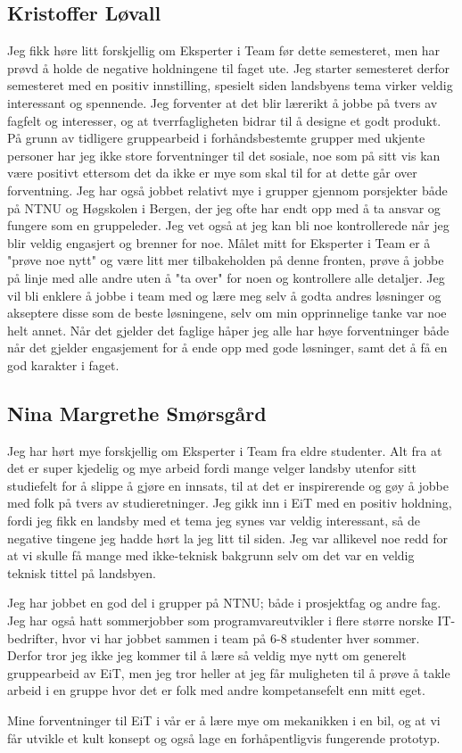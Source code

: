 \subsection*{Kristoffer Løvall}
Jeg fikk høre litt forskjellig om Eksperter i Team før dette semesteret, men har 
prøvd å holde de negative holdningene til faget ute. Jeg starter semesteret 
derfor semesteret med en positiv innstilling, spesielt siden landsbyens tema 
virker veldig interessant og spennende. Jeg forventer at det blir lærerikt å 
jobbe på tvers av fagfelt og interesser, og at tverrfagligheten bidrar til å 
designe et godt produkt. På grunn av tidligere gruppearbeid i forhåndsbestemte 
grupper med ukjente personer har jeg ikke store forventninger til det sosiale, 
noe som på sitt vis kan være positivt ettersom det da ikke er mye som skal til 
for at dette går over forventning. Jeg har også jobbet relativt mye i grupper 
gjennom porsjekter både på NTNU og Høgskolen i Bergen, der jeg ofte har endt opp 
med å ta ansvar og fungere som en gruppeleder. Jeg vet også at jeg kan bli noe 
kontrollerede når jeg blir veldig engasjert og brenner for noe.  Målet mitt for 
Eksperter i Team er å "prøve noe nytt" og være litt mer tilbakeholden på denne 
fronten, prøve å jobbe på linje med alle andre uten å "ta over" for noen og 
kontrollere alle detaljer. Jeg vil bli enklere å jobbe i team med og lære meg 
selv å godta andres løsninger og akseptere disse som de beste løsningene, selv om 
min opprinnelige tanke var noe helt annet. Når det gjelder det faglige håper jeg 
alle har høye forventninger både når det gjelder engasjement for å ende opp med 
gode løsninger, samt det å få en god karakter i faget.

\subsection*{Nina Margrethe Smørsgård}
Jeg har hørt mye forskjellig om Eksperter i Team fra eldre studenter. Alt fra 
at det er super kjedelig og mye arbeid fordi mange velger landsby utenfor sitt 
studiefelt for å slippe å gjøre en innsats, til at det er inspirerende og gøy 
å jobbe med folk på tvers av studieretninger. Jeg gikk inn i EiT med en positiv 
holdning, fordi jeg fikk en landsby med et tema jeg synes var veldig 
interessant, så de negative tingene jeg hadde hørt la jeg litt til siden. Jeg 
var allikevel noe redd for at vi skulle få mange med ikke-teknisk bakgrunn selv 
om det var en veldig teknisk tittel på landsbyen.

Jeg har jobbet en god del i grupper på NTNU; både i prosjektfag og andre fag.
Jeg har også hatt sommerjobber som programvareutvikler i flere større norske IT-
bedrifter, hvor vi har jobbet sammen i team på 6-8 studenter hver sommer. 
Derfor tror jeg ikke jeg kommer til å lære så veldig mye nytt om generelt 
gruppearbeid av EiT, men jeg tror heller at jeg får muligheten til å prøve å 
takle arbeid i en gruppe hvor det er folk med andre kompetansefelt enn mitt eget.

Mine forventninger til EiT i vår er å lære mye om mekanikken i en bil, og at 
vi får utvikle et kult konsept og også lage en forhåpentligvis fungerende prototyp.